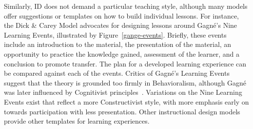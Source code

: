 Similarly, ID does not demand a particular teaching style, although many models offer suggestions or templates on how to build individual lessons.
For instance, the Dick \& Carey Model advocates for designing lessons around Gagn\'e's Nine Learning Events, illustrated by Figure~\ref{gange-events}.
Briefly, these events include an introduction to the material, the presentation of the material, an opportunity to practice the knowledge gained, assessment of the learner, and a conclusion to promote transfer.
The plan for a developed learning experience can be compared against each of the events.
Critics of Gagn\'e's Learning Events suggest that the theory is grounded too firmly in Behavioralism, although Gagn\'e was later influenced by Cognitivist principles~\citep{molenda2002new}.
Variations on the Nine Learning Events exist that reflect a more Constructivist style, with more emphasis early on towards participation with less presentation.
Other instructional design models provide other templates for learning experiences.


